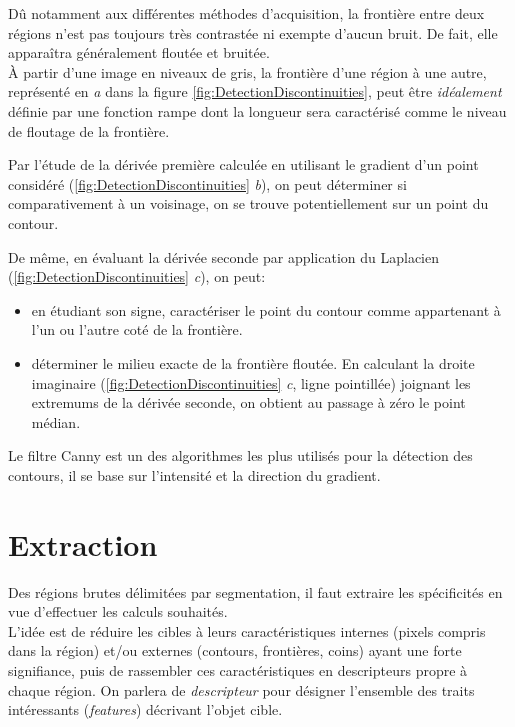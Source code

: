 \documentclass[a4paper,12pt]{report}
\begin{document}
Dû notamment aux différentes méthodes d'acquisition, la frontière entre deux régions n'est pas toujours très contrastée ni exempte d'aucun bruit. De fait, elle apparaîtra généralement floutée et bruitée.\\ 
\`A partir d'une image en niveaux de gris, la frontière d'une région à une autre, représenté en \textit{a} dans la figure \ref{fig:DetectionDiscontinuities}, peut être \textit{idéalement} définie par une fonction rampe dont la longueur sera caractérisé comme le niveau de floutage de la frontière. 

Par l'étude de la dérivée première calculée en utilisant le gradient d'un point considéré (\ref{fig:DetectionDiscontinuities} \textit{b}), on peut déterminer si comparativement à un voisinage, on se trouve potentiellement sur un point du contour. 

De même, en évaluant la dérivée seconde par application du Laplacien (\ref{fig:DetectionDiscontinuities} \textit{c}), on peut:\begin{itemize}
\item en étudiant son signe, caractériser le point du contour comme appartenant à l'un ou l'autre coté de la frontière.
\item déterminer le milieu exacte de la frontière floutée. En calculant la droite imaginaire (\ref{fig:DetectionDiscontinuities} \textit{c}, ligne pointillée) joignant les extremums de la dérivée seconde, on obtient au passage à zéro le point médian.\\
\end{itemize}

Le filtre Canny est un des algorithmes les plus utilisés pour la détection des contours, il se base sur l'intensité et la direction du gradient. \\

\section{Extraction}

Des régions brutes délimitées par segmentation, il faut extraire les spécificités en vue d'effectuer les calculs souhaités.\\

L'idée est de réduire les cibles à leurs caractéristiques internes (pixels compris dans la région) et/ou externes (contours, frontières, coins) ayant une forte signifiance, puis de rassembler ces caractéristiques en descripteurs propre à chaque région. On parlera de \textit{descripteur} pour désigner l'ensemble des traits intéressants (\textit{features}) décrivant l'objet cible. 
\end{document}
